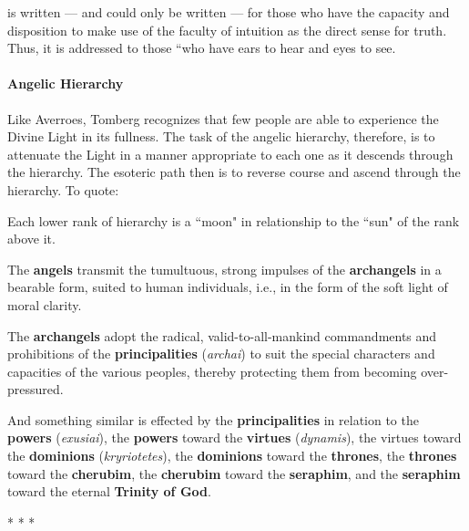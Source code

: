 \begin{quotex}
is written — and could only be written — for those who have the capacity and disposition to make use of the faculty of intuition as the direct sense for truth. Thus, it is addressed to those ``who have ears to hear and eyes to see.

\end{quotex}
\paragraph{Angelic Hierarchy}
Like Averroes, Tomberg recognizes that few people are able to experience the Divine Light in its fullness. The task of the angelic hierarchy, therefore, is to attenuate the Light in a manner appropriate to each one as it descends through the hierarchy. The esoteric path then is to reverse course and ascend through the hierarchy. To quote:

\begin{quotex}
Each lower rank of hierarchy is a ``moon" in relationship to the ``sun" of the rank above it.

The \textbf{angels} transmit the tumultuous, strong impulses of the \textbf{arch\-angels} in a bearable form, suited to human individuals, i.e., in the form of the soft light of moral clarity.

The \textbf{archangels} adopt the radical, valid-to-all-mankind commandments and prohibitions of the \textbf{principalities} (\emph{archai}) to suit the special characters and capacities of the various peoples, thereby protecting them from becoming over-pressured.

And something similar is effected by the \textbf{principalities} in relation to the \textbf{powers} (\emph{exusiai}), the \textbf{powers} toward the \textbf{virtues} (\emph{dynamis}), the virtues toward the \textbf{dominions} (\emph{kryriotetes}), the \textbf{dominions} toward the \textbf{thrones}, the \textbf{thrones} toward the \textbf{cherubim}, the \textbf{cherubim} toward the \textbf{seraphim}, and the \textbf{seraphim} toward the eternal \textbf{Trinity of God}.

\end{quotex}



\begin{center}* * *\end{center}

